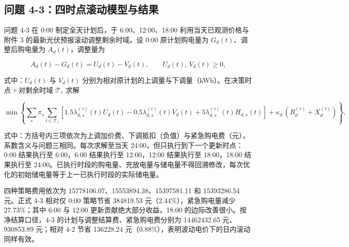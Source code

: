 {\footnotesize
{}
}

\subsection{问题 4-3：四时点滚动模型与结果}

问题 4-3 在 0:00 制定全天计划后，于 6:00、12:00、18:00 利用当天已观测价格与附件 3 的最新光伏预报滚动调整剩余时域。设 0:00 原计划购电量为 $G_d(t)$、调整后购电量为 $A_d(t)$，调整量为

\begin{equation}
  A_d(t) - G_d(t) = U_d(t) - V_d(t), \qquad U_d(t),\,V_d(t) \ge 0,
  \label{eq:q4_adjust}
\end{equation}

式中：$U_d(t)$ 与 $V_d(t)$ 分别为相对原计划的上调量与下调量（kWh）。在决策时点 $\tau$ 对剩余时域 $\mathcal T_\tau$ 求解

\begin{equation}
  \min\left\{
    \sum_s \pi_s \sum_{t\in\mathcal T_\tau}\left[1.5\lambda^{(\tau)}_{d,s}(t)U_d(t) - 0.5\lambda^{(\tau)}_{d,s}(t)V_d(t) + 5\lambda^{(\tau)}_{d,s}(t)H_{d,s}(t)\right]
    + \kappa_d\,(R_d^{(\tau)} + X_d^{(\tau)})
  \right\},
  \label{eq:q4_obj3}
\end{equation}

式中：方括号内三项依次为上调加价费、下调抵扣（负值）与紧急购电费（元），系数含义与问题三相同。每次求解至当天 24:00，但只执行到下一个更新时点：0:00 结果执行至 6:00，6:00 结果执行至 12:00，12:00 结果执行至 18:00，18:00 结果执行至 24:00。已执行时段的购电量、充放电量与储电量不得回溯修改，每次优化的初始储电量等于上一已执行时段的实际储电量。

四种策略费用依次为 15778106.07、15553894.38、15397581.11 和 15393286.54 元。正式 4-3 相对仅 0:00 策略节省 384819.53 元（2.44\%），紧急购电量减少 27.73\%；其中 6:00 与 12:00 更新贡献绝大部分收益，18:00 的边际改善很小。按净结算口径，4-3 的计划与调整结算费、紧急购电费分别为 14462432.65 元、930853.89 元；相对 4-2 节省 136228.24 元（0.88\%），表明波动电价下的日内滚动同样有效。

